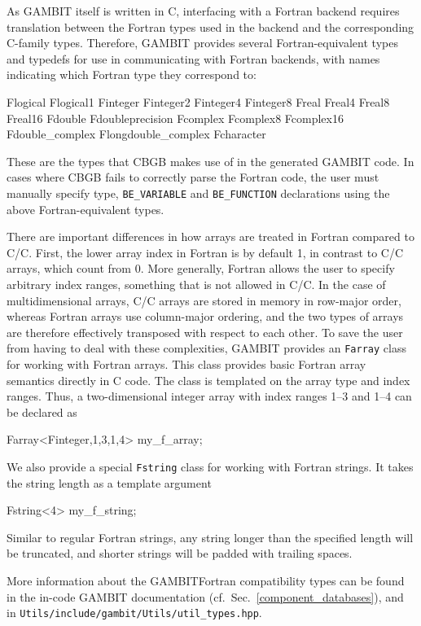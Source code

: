 \documentclass[pdftex,twocolumn,epjc3_preprint,runningheads]{svjour3}
\renewcommand{\_}{\discretionary{\underscore}{}{\underscore}}
\newcommand\cpp[1]{{\lstinline!#1!}}  %
\newcommand\term[1]{{\lstset{style=terminal}\lstinline!#1!\lstset{style=cpp}}}
\newcommand{\gambit}{\textsf{GAMBIT}\xspace}
\newcommand{\GB}{\gambit}
\newcommand\xx{\raisebox{0.2ex}{\smaller ++}\xspace}
\newcommand\Cpp{\textsf{C\xx}\xspace}
\newcommand\plainC{\textsf{C}\xspace}
\newcommand\Fortran{\textsf{Fortran}\xspace}
\begin{document}
As \GB itself is written in \Cpp, interfacing with a \Fortran backend requires translation between the \Fortran types used in the backend and the corresponding \plainC-family types. Therefore, \GB provides several \Fortran-equivalent types and typedefs for use in communicating with \Fortran backends, with names indicating which \Fortran type they correspond to:
\begin{lstcpp}
Flogical
Flogical1
Finteger
Finteger2
Finteger4
Finteger8
Freal
Freal4
Freal8
Freal16
Fdouble
Fdoubleprecision
Fcomplex
Fcomplex8
Fcomplex16
Fdouble_complex
Flongdouble_complex
Fcharacter
\end{lstcpp}
%
These are the types that \textsf{CBGB} makes use of in the generated \GB code. In cases where \textsf{CBGB} fails to correctly parse the Fortran code, the user must manually specify type, \cpp{BE_VARIABLE} and \cpp{BE_FUNCTION} declarations using the above Fortran-equivalent types.

There are important differences in how arrays are treated in \Fortran compared to \plainC/\Cpp. First, the lower array index in \Fortran is by default 1, in contrast to \plainC/\Cpp arrays, which count from 0. More generally, \Fortran allows the user to specify arbitrary index ranges, something that is not allowed in \plainC/\Cpp. In the case of multidimensional arrays, \plainC/\Cpp arrays are stored in memory in row-major order, whereas \Fortran arrays use column-major ordering, and the two types of arrays are therefore effectively transposed with respect to each other. To save the user from having to deal with these complexities, \GB provides an \lstinline|Farray| class for working with \Fortran arrays.  This class provides basic \Fortran array semantics directly in \Cpp code. The class is templated on the array type and index ranges. Thus, a two-dimensional integer array with index ranges 1--3 and 1--4 can be declared as
\begin{lstcpp}
Farray<Finteger,1,3,1,4> my_f_array;
\end{lstcpp}

We also provide a special \lstinline|Fstring| class for working with \Fortran strings. It takes the string length as a template argument
\begin{lstcpp}
Fstring<4> my_f_string;
\end{lstcpp}
Similar to regular \Fortran strings, any string longer than the specified length will be truncated, and shorter strings will be padded with trailing spaces.

More information about the \GB \Fortran compatibility types can be found in the in-code \GB documentation (cf.\ Sec.\ \ref{component_databases}), and in \term{Utils/include/gambit/Utils/util_types.hpp}.
\end{document}
